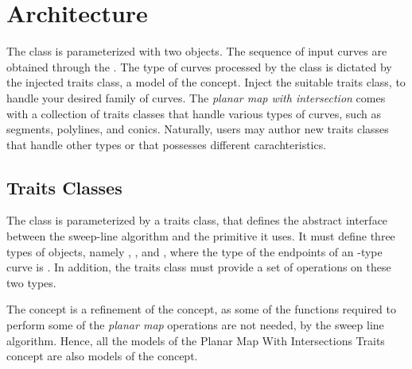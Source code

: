 \section{Architecture}

The  class is parameterized with
two objects. The sequence of input curves are obtained through the
. The type of curves processed by the
 class is dictated
by the injected traits class, a model of the 
concept. Inject the suitable traits class, to handle your desired family of
curves. The {\em planar map with intersection} comes with a collection of
traits classes that handle various types of curves, such as segments,
polylines, and conics. Naturally, users may author new traits classes
that handle other types or that possesses different carachteristics.


\subsection{Traits Classes}
The  class is parameterized by a
traits class, that defines the abstract interface between the sweep-line
algorithm and the primitive it uses. It must define three types of objects,
namely , , and ,
where the type of the endpoints of an -type curve
is . In addition, the traits class must provide a set of
operations on these two types.

The  concept is a refinement of the 
 concept, as some of the functions required to
perform some of the {\em planar map} operations are not needed, by the sweep
line algorithm. Hence, all the models of the
Planar Map With Intersections Traits 
concept are also models of the  concept. 

